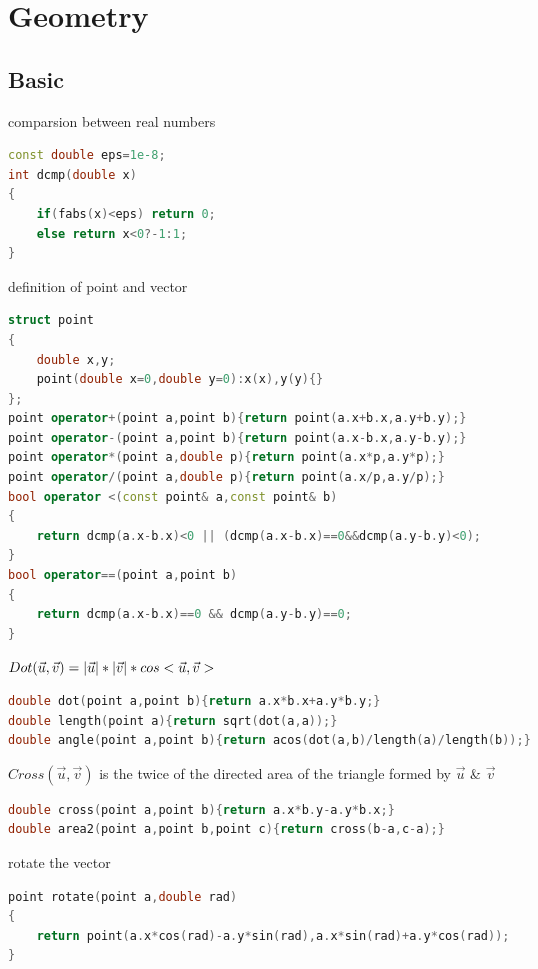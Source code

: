\chapter{Geometry}
 \section{Basic}

\hspace{0.4cm} comparsion between real numbers
  \begin{lstlisting}[language=C++]
const double eps=1e-8;  
int dcmp(double x)  
{  
    if(fabs(x)<eps) return 0;  
    else return x<0?-1:1;  
}
  \end{lstlisting}

definition of point and vector
  \begin{lstlisting}[language=C++]
struct point  
{  
    double x,y;  
    point(double x=0,double y=0):x(x),y(y){}  
};  
point operator+(point a,point b){return point(a.x+b.x,a.y+b.y);}  
point operator-(point a,point b){return point(a.x-b.x,a.y-b.y);}  
point operator*(point a,double p){return point(a.x*p,a.y*p);}  
point operator/(point a,double p){return point(a.x/p,a.y/p);}  
bool operator <(const point& a,const point& b)  
{  
    return dcmp(a.x-b.x)<0 || (dcmp(a.x-b.x)==0&&dcmp(a.y-b.y)<0);  
}  
bool operator==(point a,point b)  
{  
    return dcmp(a.x-b.x)==0 && dcmp(a.y-b.y)==0;  
}
  \end{lstlisting}

\newpage
$ Dot(\vec u,\vec v) = \lvert\vec u\rvert * \lvert\vec v\rvert * cos<\vec u,\vec v>$
  \begin{lstlisting}[language=C++]
double dot(point a,point b){return a.x*b.x+a.y*b.y;}
double length(point a){return sqrt(dot(a,a));}
double angle(point a,point b){return acos(dot(a,b)/length(a)/length(b));}
  \end{lstlisting}

$Cross(\vec u,\vec v)$ is the twice of the directed area of the triangle formed by $\vec u$ \& $\vec v$
  \begin{lstlisting}[language=C++]
double cross(point a,point b){return a.x*b.y-a.y*b.x;}
double area2(point a,point b,point c){return cross(b-a,c-a);}
  \end{lstlisting}

rotate the vector
  \begin{lstlisting}[language=C++]
point rotate(point a,double rad)  
{  
    return point(a.x*cos(rad)-a.y*sin(rad),a.x*sin(rad)+a.y*cos(rad));  
}  
  \end{lstlisting}

